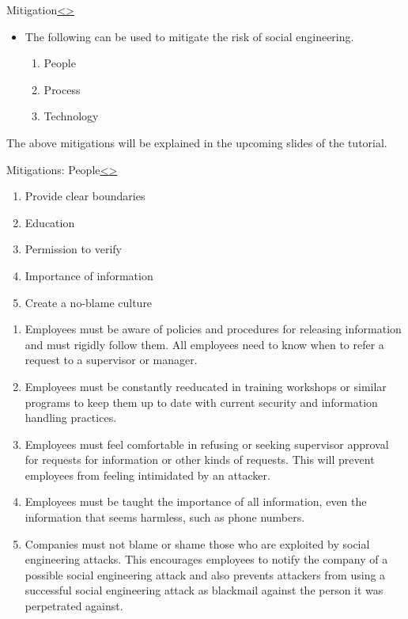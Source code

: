 \documentclass[12pt]{extarticle}
\newenvironment{instructionblock}{\Large\bgroup}{\egroup}
\begin{document}
\pagebreak

\begin{slide}{Mitigation}{\hyperref[slide 17]{\textless}\hyperref[slide 19]{\textgreater}}
\vskip 5pt
\begin{instructionblock}
\begin{itemize}
	\item The following can be used to mitigate the risk of social engineering.
	\begin{enumerate}
		\item People
		\item Process
		\item Technology
	\end{enumerate}
\end{itemize}
\end{instructionblock}
\end{slide}

The above mitigations will be explained in the upcoming slides of the tutorial.
\pagebreak
\begin{slide}{Mitigations: People}{\hyperref[slide 18]{\textless}\hyperref[slide 20]{\textgreater}}
\vskip 5pt
\begin{instructionblock}
	\begin{enumerate}
		\item Provide clear boundaries
		\item Education
		\item Permission to verify
		\item Importance of information
		\item Create a no-blame culture
	\end{enumerate}
\end{instructionblock}
\end{slide}
\begin{enumerate}
	\item Employees must be aware of policies and procedures for releasing information and must rigidly follow them. All employees need to know when to refer a request to a supervisor or manager.\cite{b2}
	\item Employees must be constantly reeducated in training workshops or similar programs to keep them up to date with current security and information handling practices.\cite{b2}
	\item Employees must feel comfortable in refusing or seeking supervisor approval for requests for information or other kinds of requests. This will prevent employees from feeling intimidated by an attacker.\cite{b2}
	\item Employees must be taught the importance of all information, even the information that seems harmless, such as phone numbers.\cite{b2}
	\item Companies must not blame or shame those who are exploited by social engineering attacks. This encourages employees to notify the company of a possible social engineering attack and also prevents attackers from using a successful social engineering attack as blackmail against the person it was perpetrated against.\cite{b2}
\end{enumerate}
\end{document}
